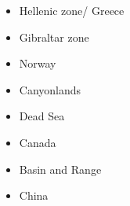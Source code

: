 \begin{itemize}
{\scriptsize
\cite{tabs09}
}
\item Hellenic zone/ Greece  
{\scriptsize
\cite{spwv88}
}
\item Gibraltar zone 
{\scriptsize
\cite{gumr02}
} 
\item Norway 
{\scriptsize
\cite{bubj15}
}
\item Canyonlands 
{\scriptsize
\cite{trca94}
\cite{scwa02}
\cite{grsk03}
}
\item Dead Sea 
{\scriptsize
\cite{sopg05}
}
\item Canada 
{\scriptsize
\cite{brbw93}
\cite{pelj99}
}
\item Basin and Range 
{\scriptsize
\cite{brbe89c}
}
\item China 
{\scriptsize
\cite{zhst10}
}

\end{itemize}







